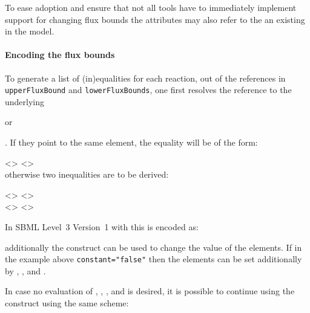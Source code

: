 \begin{newsection}
\begin{deprecated}
{
To ease adoption and ensure that not all tools have to immediately implement
support for changing flux bounds the attributes may also refer to the an existing
\FluxBound in the model.
}
\end{deprecated}

\paragraph{Encoding the flux bounds}
To generate a list of (in)equalities for each reaction, out of the references
in \texttt{upperFluxBound} and \texttt{lowerFluxBounds}, one first resolves the
reference to the underlying \Parameter
\begin{deprecated}
or \FluxBound
\end{deprecated}. If they point to the same element, the equality will be of the form:

<> \token{=} <>\\

otherwise two inequalities are to be derived:

<> \token{>=} <>\\
<> \token{<=} <>

In SBML Level~3 Version~1 with \FBC this is encoded as:
%

additionally the \InitialAssignment construct can be used to change the value of the
\Parameter elements. If in the example above \texttt{constant="false"} then the elements
can be set additionally by  \EventAssignment, \AssignmentRule, and \AlgebraicRule.


\begin{deprecated}

In case no evaluation of \InitialAssignment, \EventAssignment, \AssignmentRule,
and \AlgebraicRule is desired, it is possible to continue using the \FluxBound
construct using the same scheme:


\end{deprecated}

%


%

%


\end{newsection}
